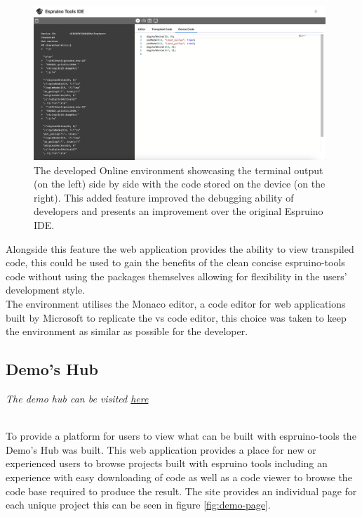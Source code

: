 \documentclass{l4proj}
\begin{document}
\begin{figure}[!ht]
    \centering
    \includegraphics[width=11cm]{dissertation/images/online-env-device-code.png}
    \caption{The developed Online environment showcasing the terminal output (on the left) side by side with the code stored on the device (on the right). This added feature improved the debugging ability of developers and presents an improvement over the original Espruino IDE.}
    \label{fig:online-env-device-code}
\end{figure}

Alongside this feature the web application provides the ability to view transpiled code, this could be used to gain the benefits of the clean concise espruino-tools code without using the packages themselves allowing for flexibility in the users' development style.
\\
The environment utilises the Monaco editor, a code editor for web applications built by Microsoft to replicate the vs code editor, this choice was taken to keep the environment as similar as possible for the developer.

\subsection{Demo's Hub}
\begin{center}
\textit{The demo hub can be visited \href{https://demos-mu.vercel.app/}{here}} 
\end{center}
\\
To provide a platform for users to view what can be built with espruino-tools the Demo's Hub was built. This web application provides a place for new or experienced users to browse projects built with espruino tools including an experience with easy downloading of code as well as a code viewer to browse the code base required to produce the result. The site provides an individual page for each unique project this can be seen in figure \ref{fig:demo-page}.
\end{document}
